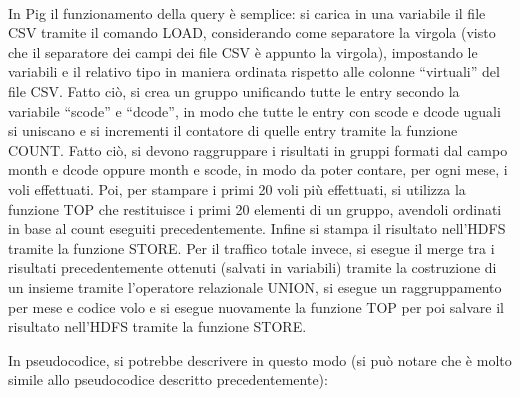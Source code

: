 \documentclass[11pt]{article} %
\begin{document}
~

In Pig il funzionamento della query è semplice: si carica in una variabile il file CSV tramite il comando LOAD, considerando come separatore la virgola (visto che il separatore dei campi dei file CSV è appunto la virgola), impostando le variabili e il relativo tipo in maniera ordinata rispetto alle colonne ``virtuali'' del file CSV. Fatto ciò, si crea un gruppo unificando tutte le entry secondo la variabile ``scode'' e ``dcode'', in modo che tutte le entry con scode e dcode uguali si uniscano e si incrementi il contatore di quelle entry tramite la funzione COUNT. Fatto ciò, si devono raggruppare i risultati in gruppi formati dal campo month e dcode oppure month e scode, in modo da poter contare, per ogni mese, i voli effettuati. Poi, per stampare i primi 20 voli più effettuati, si utilizza la funzione TOP che restituisce i primi 20 elementi di un gruppo, avendoli ordinati in base al count eseguiti precedentemente. Infine si stampa il risultato nell'HDFS tramite la funzione STORE. Per il traffico totale invece, si esegue il merge tra i risultati precedentemente ottenuti (salvati in variabili) tramite la costruzione di un insieme tramite l'operatore relazionale UNION, si esegue un raggruppamento per mese e codice volo e si esegue nuovamente la funzione TOP per poi salvare il risultato nell'HDFS tramite la funzione STORE.

In pseudocodice, si potrebbe descrivere in questo modo (si può notare che è molto simile allo pseudocodice descritto precedentemente):
\end{document}
